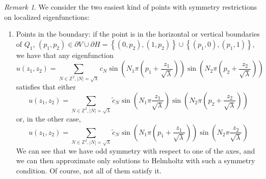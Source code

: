 \documentclass{amsart}
\theoremstyle{definition}
\theoremstyle{remark}
\newtheorem{remark}[theorem]{Remark}
\numberwithin{equation}{section}
\theoremstyle{definition}
\theoremstyle{remark}
\begin{document}
\begin{remark}\label{RemarkSymm}We consider the two easiest kind of points with symmetry restrictions on localized eigenfunctions: 
	
	\begin{enumerate}
	\item Points in the boundary: if the point is in the horizontal or vertical boundaries of $Q_1$, $(p_1,p_2)\in \partial V\cup \partial H=\left\{(0,p_2),(1,p_2)\right\}\cup \left\{(p_1,0),(p_1,1)\right\}$, we have that any eigenfunction \begin{equation}u(z_1,z_2)=\sum_{N\in\mathbb{Z}^2, |N|=\sqrt{\lambda}}c_N\sin\left(N_1\pi\left(p_1+\frac{z_1}{\sqrt{\lambda}}\right)\right)\sin\left(N_2\pi\left(p_2+\frac{z_2}{\sqrt{\lambda}}\right)\right)\end{equation} satisfies that either  \begin{equation}u(z_1,z_2)=\sum_{N\in\mathbb{Z}^2, |N|=\sqrt{\lambda}}\tilde{c}_N\sin\left(N_1\pi\frac{z_1}{\sqrt{\lambda}}\right)\sin\left(N_2\pi\left(p_2+\frac{z_2}{\sqrt{\lambda}}\right)\right)\end{equation} or, in the other case, \begin{equation}u(z_1,z_2)=\sum_{N\in\mathbb{Z}^2, |N|=\sqrt{\lambda}}\tilde{c}_N\sin\left(N_1\pi\left(p_1+\frac{z_1}{\sqrt{\lambda}}\right)\right)\sin\left(N_2\pi\frac{z_2}{\sqrt{\lambda}}\right)\end{equation}
	We can see that we have odd symmetry with respect to one of the axes, and we can then approximate only solutions to Helmholtz with such a symmetry condition. Of course, not all of them satisfy it.
	

\end{enumerate}
\end{remark}
\end{document}
